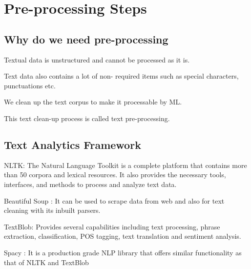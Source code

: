 	\section{Pre-processing Steps}
	\subsection{Why do we need pre-processing}
	\begin{bulletedlist}
		\item Textual data is unstructured and cannot be processed as it is.
		\item Text data also contains a lot of non- required items such as special characters, punctuations etc.
		\item We clean up the text corpus to make it processable by ML.
		\item This text clean-up process is called text pre-processing.
	\end{bulletedlist}

	\subsection{Text Analytics Framework}
	\begin{bulletedlist}
		\item NLTK: The Natural Language Toolkit is a complete platform that contains more than 50 corpora and lexical resources. It also provides the necessary tools, interfaces, and methods to process and analyze text data.
		\item Beautiful Soup : It can be used to scrape data from web and also for text cleaning with its inbuilt parsers.
		\item TextBlob: Provides several capabilities including text processing, phrase extraction, classification, POS tagging, text translation and sentiment analysis.
		\item Spacy : It is a production grade NLP library that offers similar functionality as that of NLTK and TextBlob
	\end{bulletedlist}

